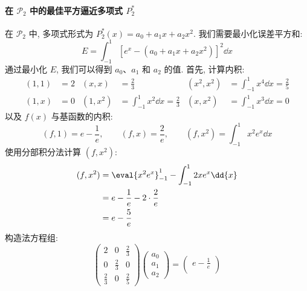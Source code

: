 \documentclass[lang = zh]{iwork}
\begin{document}
\begin{sol}
  \paragraph{在 $\mathscr{P}_2$ 中的最佳平方逼近多项式 $P_2^*$}
  在 $\mathscr{P}_2$ 中, 多项式形式为 $P_2^*(x) = a_0 + a_1 x + a_2 x^2$.
  我们需要最小化误差平方和:
  \begin{equation*}
    E = \int_{-1}^{1} [e^x - (a_0 + a_1 x + a_2 x^2)]^2 \dd{x}
  \end{equation*}
  通过最小化 $E$, 我们可以得到 $a_0$、$a_1$ 和 $a_2$ 的值.
  首先, 计算内积:
  \begin{align*}
    (1, 1)     & = 2                                      &
    (x, x)     & = \frac{2}{3}                            &
    (x^2, x^2) & = \int_{-1}^{1} x^4 \dd{x} = \frac{2}{5}   \\
    (1, x)     & = 0                                      &
    (1, x^2)   & = \int_{-1}^{1} x^2 \dd{x} = \frac{2}{3} &
    (x, x^2)   & = \int_{-1}^{1} x^3 \dd{x} = 0
  \end{align*}
  以及 $f(x)$ 与基函数的内积:
  \begin{equation*}
    (f, 1) = e - \frac{1}{e}, \qquad
    (f, x) = \frac{2}{e},     \qquad
    (f, x^2) = \int_{-1}^{1} x^2 e^x \dd{x}
  \end{equation*}
  使用分部积分法计算 $(f, x^2)$:
  \begin{equation*}
    \begin{split}
      (f, x^2)
       & = \eval{x^2 e^x}_{-1}^{1} - \int_{-1}^{1} 2x e^x \dd{x} \\
       & = e - \frac{1}{e} - 2 \cdot \frac{2}{e}                 \\
       & = e - \frac{5}{e}
    \end{split}
  \end{equation*}
  构造法方程组:
  \begin{equation*}
    \begin{pmatrix}
      2           & 0           & \frac{2}{3} \\
      0           & \frac{2}{3} & 0           \\
      \frac{2}{3} & 0           & \frac{2}{5}
    \end{pmatrix}
    \begin{pmatrix}
      a_0 \\
      a_1 \\
      a_2
    \end{pmatrix}
    =
    \begin{pmatrix}
      e - \frac{1}{e} \\

\end{pmatrix}
\end{equation*}
\end{sol}
\end{document}
